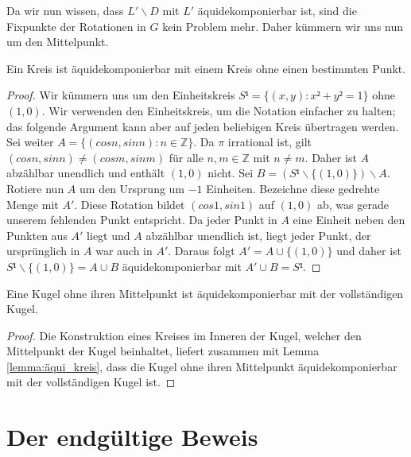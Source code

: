 \begin{lemma}
Da wir nun wissen, dass $L'\backslash D$ mit $L'$ äquidekomponierbar ist, sind die Fixpunkte der Rotationen in $G$ kein Problem mehr.
Daher kümmern wir uns nun um den Mittelpunkt.

\begin{lemma} \label{lemma:aequi_kreis}
Ein Kreis ist äquidekomponierbar mit einem Kreis ohne einen bestimmten Punkt.
\end{lemma}
\begin{proof} 
Wir kümmern uns um den Einheitskreis $S¹=\{(x,y):x²+y²=1\}$ ohne ${(1,0)}$. Wir verwenden den Einheitskreis, um die Notation einfacher zu halten; 
das folgende Argument kann aber auf jeden beliebigen Kreis übertragen werden.
Sei weiter $A=\{(cos n,sin n):n\in\mathbb{Z}\}$. Da $\pi$ irrational ist, gilt $(cos n,sin n)\neq (cos m, sin m)$ für alle $n,m\in\mathbb{Z}$
mit $n\neq m$. Daher ist $A$ abzählbar unendlich und enthält $(1,0)$ nicht. Sei $B=(S¹\backslash\{(1,0)\})\backslash A$.
Rotiere nun $A$ um den Ursprung um $-1$ Einheiten. Bezeichne diese gedrehte Menge mit $A'$. Diese Rotation bildet $(cos 1,sin 1)$ auf $(1,0)$
ab, was gerade unserem fehlenden Punkt entspricht. Da jeder Punkt in $A$ eine Einheit neben den Punkten aus $A'$ liegt und $A$ abzählbar unendlich
ist, liegt jeder Punkt, der ursprünglich in $A$ war auch in $A'$. Daraus folgt $A'=A\cup \{(1,0)\}$ und daher ist
$S¹\backslash \{(1,0)\}=A\cup B$ äquidekomponierbar mit $A'\cup B=S¹$.
\end{proof}

\begin{theorem} \label{theorem:aequi_kugel}
Eine Kugel ohne ihren Mittelpunkt ist äquidekomponierbar mit der vollständigen Kugel.
\end{theorem}
\begin{proof} 
Die Konstruktion eines Kreises im Inneren der Kugel, welcher den Mittelpunkt der Kugel beinhaltet, liefert zusammen mit Lemma \ref{lemma:äqui_kreis},
dass die Kugel ohne ihren Mittelpunkt äquidekomponierbar mit der vollständigen Kugel ist.
\end{proof}

\section{Der endgültige Beweis}


\end{lemma}
